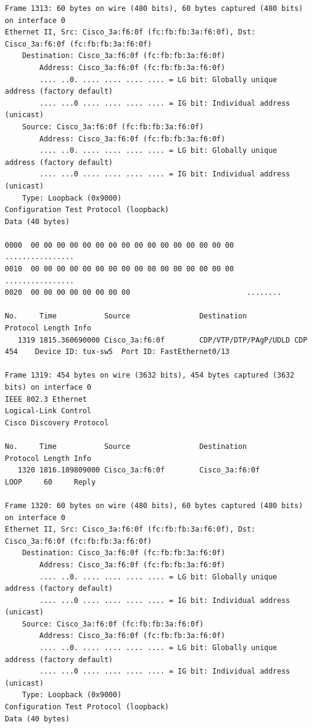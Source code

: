 \documentclass[a4paper,11pt]{article}
\begin{document}
\begin{lstlisting}
Frame 1313: 60 bytes on wire (480 bits), 60 bytes captured (480 bits) on interface 0
Ethernet II, Src: Cisco_3a:f6:0f (fc:fb:fb:3a:f6:0f), Dst: Cisco_3a:f6:0f (fc:fb:fb:3a:f6:0f)
    Destination: Cisco_3a:f6:0f (fc:fb:fb:3a:f6:0f)
        Address: Cisco_3a:f6:0f (fc:fb:fb:3a:f6:0f)
        .... ..0. .... .... .... .... = LG bit: Globally unique address (factory default)
        .... ...0 .... .... .... .... = IG bit: Individual address (unicast)
    Source: Cisco_3a:f6:0f (fc:fb:fb:3a:f6:0f)
        Address: Cisco_3a:f6:0f (fc:fb:fb:3a:f6:0f)
        .... ..0. .... .... .... .... = LG bit: Globally unique address (factory default)
        .... ...0 .... .... .... .... = IG bit: Individual address (unicast)
    Type: Loopback (0x9000)
Configuration Test Protocol (loopback)
Data (40 bytes)

0000  00 00 00 00 00 00 00 00 00 00 00 00 00 00 00 00   ................
0010  00 00 00 00 00 00 00 00 00 00 00 00 00 00 00 00   ................
0020  00 00 00 00 00 00 00 00                           ........

No.     Time           Source                Destination           Protocol Length Info
   1319 1815.360690000 Cisco_3a:f6:0f        CDP/VTP/DTP/PAgP/UDLD CDP      454    Device ID: tux-sw5  Port ID: FastEthernet0/13  

Frame 1319: 454 bytes on wire (3632 bits), 454 bytes captured (3632 bits) on interface 0
IEEE 802.3 Ethernet 
Logical-Link Control
Cisco Discovery Protocol

No.     Time           Source                Destination           Protocol Length Info
   1320 1816.109809000 Cisco_3a:f6:0f        Cisco_3a:f6:0f        LOOP     60     Reply

Frame 1320: 60 bytes on wire (480 bits), 60 bytes captured (480 bits) on interface 0
Ethernet II, Src: Cisco_3a:f6:0f (fc:fb:fb:3a:f6:0f), Dst: Cisco_3a:f6:0f (fc:fb:fb:3a:f6:0f)
    Destination: Cisco_3a:f6:0f (fc:fb:fb:3a:f6:0f)
        Address: Cisco_3a:f6:0f (fc:fb:fb:3a:f6:0f)
        .... ..0. .... .... .... .... = LG bit: Globally unique address (factory default)
        .... ...0 .... .... .... .... = IG bit: Individual address (unicast)
    Source: Cisco_3a:f6:0f (fc:fb:fb:3a:f6:0f)
        Address: Cisco_3a:f6:0f (fc:fb:fb:3a:f6:0f)
        .... ..0. .... .... .... .... = LG bit: Globally unique address (factory default)
        .... ...0 .... .... .... .... = IG bit: Individual address (unicast)
    Type: Loopback (0x9000)
Configuration Test Protocol (loopback)
Data (40 bytes)


\end{lstlisting}
\end{document}
